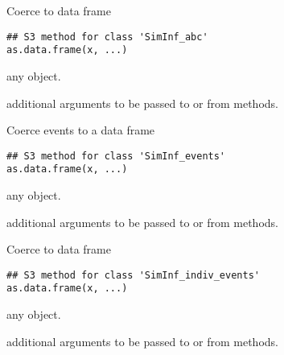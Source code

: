 \documentclass[letterpaper]{book}
\begin{document}
%
\begin{Description}
Coerce to data frame
\end{Description}
%
\begin{Usage}
\begin{verbatim}
## S3 method for class 'SimInf_abc'
as.data.frame(x, ...)
\end{verbatim}
\end{Usage}
%
\begin{Arguments}
\begin{ldescription}
\item[\code{x}] any \R{} object.

\item[\code{...}] additional arguments to be passed to or from methods.
\end{ldescription}
\end{Arguments}
%
\begin{Description}
Coerce events to a data frame
\end{Description}
%
\begin{Usage}
\begin{verbatim}
## S3 method for class 'SimInf_events'
as.data.frame(x, ...)
\end{verbatim}
\end{Usage}
%
\begin{Arguments}
\begin{ldescription}
\item[\code{x}] any \R{} object.

\item[\code{...}] additional arguments to be passed to or from methods.
\end{ldescription}
\end{Arguments}
%
\begin{Description}
Coerce to data frame
\end{Description}
%
\begin{Usage}
\begin{verbatim}
## S3 method for class 'SimInf_indiv_events'
as.data.frame(x, ...)
\end{verbatim}
\end{Usage}
%
\begin{Arguments}
\begin{ldescription}
\item[\code{x}] any \R{} object.

\item[\code{...}] additional arguments to be passed to or from methods.
\end{ldescription}
\end{Arguments}
\end{document}
